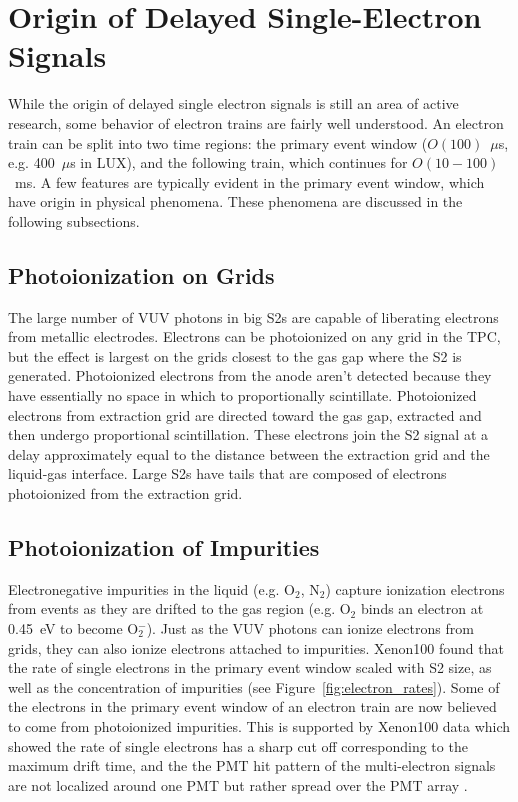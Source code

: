 \section{Origin of Delayed Single-Electron Signals}
While the origin of delayed single electron signals is still an area of active research, some behavior of electron trains are fairly well understood. An electron train can be split into two time regions: the primary event window ($O(100)$~$\mu$s, e.g. 400~$\mu$s in \ac{LUX}), and the following train, which continues for $O(10-100)$~ms. A few features are typically evident in the primary event window, which have origin in physical phenomena. These phenomena are discussed in the following subsections. 

\subsection{Photoionization on Grids} 
The large number of \ac{VUV} photons in big S2s are capable of liberating electrons from metallic electrodes. Electrons can be photoionized on any grid in the \ac{TPC}, but the effect is largest on the grids closest to the gas gap where the S2 is generated. Photoionized electrons from the anode aren't detected because they have essentially no space in which to proportionally scintillate. Photoionized electrons from extraction grid are directed toward the gas gap, extracted and then undergo proportional scintillation. These electrons join the S2 signal at a delay approximately equal to the distance between the extraction grid and the liquid-gas interface. Large S2s have tails that are composed of electrons photoionized from the extraction grid. 


\subsection{Photoionization of Impurities} 
Electronegative impurities in the liquid (e.g. O$_{2}$, N$_{2}$) capture ionization electrons from events as they are drifted to the gas region (e.g. O$_{2}$ binds an electron at 0.45~eV to become O$^{-}_{2}$). Just as the \ac{VUV} photons can ionize electrons from grids, they can also ionize electrons attached to impurities. Xenon100 found that the rate of single electrons in the primary event window scaled with S2 size, as well as the concentration of impurities \cite{Aprile2014} (see Figure~\ref{fig:electron_rates}). Some of the electrons in the primary event window of an electron train are now believed to come from photoionized impurities. This is supported by Xenon100 data which showed the rate of single electrons has a sharp cut off corresponding to the maximum drift time, and the the PMT hit pattern of the multi-electron signals are not localized around one PMT but rather spread over the PMT array  \cite{Aprile2014}. 

